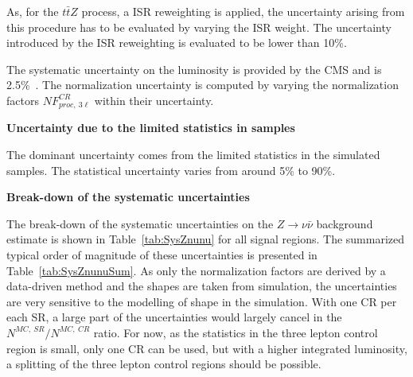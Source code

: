 As, for the $t\bar{t}Z$ process, a ISR reweighting is applied, the uncertainty arising from this procedure has to be evaluated by varying the ISR weight. The uncertainty introduced by the ISR reweighting is evaluated to be lower than 10\%. 

The systematic uncertainty on the luminosity is provided by the CMS and is  2.5\%~\cite{CMS-PAS-LUM-17-001}. The normalization uncertainty is computed by varying the normalization factors $NF_{proc,~3\ell}^{CR}$ within their uncertainty.

\textbf{Uncertainty due to the limited statistics in samples}

The dominant uncertainty comes from the limited statistics in the simulated samples. The statistical uncertainty varies from around 5\% to 90\%.

\textbf{Break-down of the systematic uncertainties}

The break-down of the systematic uncertainties on the $Z \to \nu \bar{\nu}$  background estimate is shown in Table~\ref{tab:SysZnunu} for all signal regions. The summarized typical order of magnitude of these uncertainties is presented in Table~\ref{tab:SysZnunuSum}. As only the normalization factors are derived by a data-driven method and the shapes are taken from simulation, the uncertainties are very sensitive to the modelling of shape in the simulation. With one CR per each SR, a large part of the uncertainties would largely cancel in the $N^{MC,~SR}/ N^{MC,~CR}$ ratio. For now, as the statistics in the three lepton control region is small, only one CR can be used, but with a higher integrated luminosity, a splitting of the three lepton control regions should be possible.


